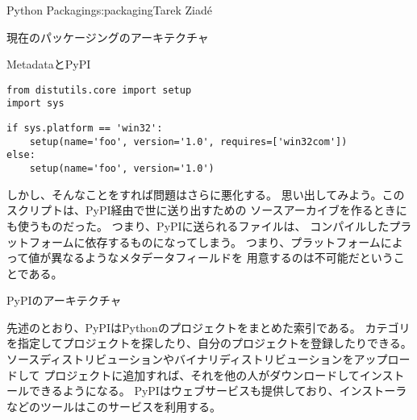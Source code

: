 \begin{aosachapter}{Python Packaging}{s:packaging}{Tarek Ziad\'{e}}
\begin{aosasect1}{現在のパッケージングのアーキテクチャ}
\begin{aosasect2}{MetadataとPyPI}
\begin{verbatim}
from distutils.core import setup
import sys
\end{verbatim}
\begin{verbatim}
if sys.platform == 'win32':
    setup(name='foo', version='1.0', requires=['win32com'])
else:
    setup(name='foo', version='1.0')
\end{verbatim}

\noindent
しかし、そんなことをすれば問題はさらに悪化する。
思い出してみよう。このスクリプトは、PyPI経由で世に送り出すための
ソースアーカイブを作るときにも使うものだった。
つまり、PyPIに送られるファイルは、
コンパイルしたプラットフォームに依存するものになってしまう。
つまり、プラットフォームによって値が異なるようなメタデータフィールドを
用意するのは不可能だということである。

\end{aosasect2}

\begin{aosasect2}{PyPIのアーキテクチャ}


先述のとおり、PyPIはPythonのプロジェクトをまとめた索引である。
カテゴリを指定してプロジェクトを探したり、自分のプロジェクトを登録したりできる。
ソースディストリビューションやバイナリディストリビューションをアップロードして
プロジェクトに追加すれば、それを他の人がダウンロードしてインストールできるようになる。
PyPIはウェブサービスも提供しており、インストーラなどのツールはこのサービスを利用する。


\end{aosasect2}
\end{aosasect1}
\end{aosachapter}
